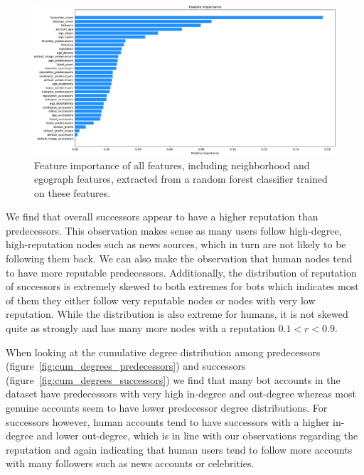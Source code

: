 \begin{figure}
    \centering
    \includegraphics[width=\textwidth]{FIG/feature_importance-crop.pdf}
    \caption{Feature importance of all features, including neighborhood and egograph features, extracted from a random forest classifier trained on these features.}
    \label{fig:importance}
\end{figure}

We find that overall successors appear to have a higher reputation than predecessors. This observation makes sense as many users follow high-degree, high-reputation nodes such as news sources, which in turn are not likely to be following them back. We can also make the observation that human nodes tend to have more reputable predecessors. Additionally, the distribution of reputation of successors is extremely skewed to both extremes for bots which indicates most of them they either follow very reputable nodes or nodes with very low reputation. While the distribution is also extreme for humans, it is not skewed quite as strongly and has many more nodes with a reputation $0.1 < r < 0.9$.

When looking at the cumulative degree distribution among predecessors (figure~\ref{fig:cum_degrees_predecessors}) and successors (figure~\ref{fig:cum_degrees_successors}) we find that many bot accounts in the dataset have predecessors with very high in-degree and out-degree whereas most genuine accounts seem to have lower predecessor degree distributions. For successors however, human accounts tend to have successors with a higher in-degree and lower out-degree, which is in line with our observations regarding the reputation and again indicating that human users tend to follow more accounts with many followers such as news accounts or celebrities. 


